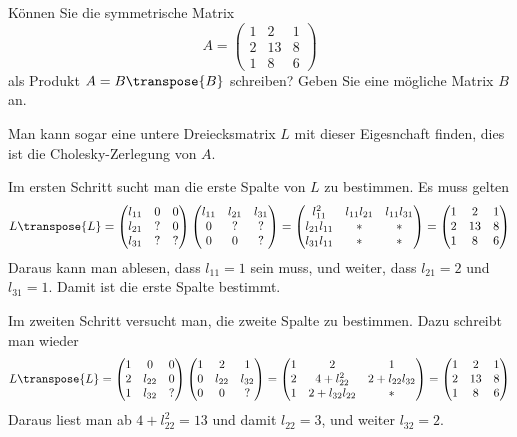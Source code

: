 Können Sie die symmetrische Matrix
\[
A=\begin{pmatrix}
1& 2&1\\
2&13&8\\
1& 8&6
\end{pmatrix}
\]
als Produkt $A=B\transpose{B}$ schreiben? Geben Sie eine mögliche Matrix $B$ an.


\begin{loesung}
Man kann sogar eine untere Dreiecksmatrix $L$ mit dieser Eigesnchaft finden,
dies ist die Cholesky-Zerlegung von $A$.

Im ersten Schritt sucht man die erste Spalte von $L$ zu bestimmen.
Es muss gelten
\[
L\transpose{L}=
\begin{pmatrix}
l_{11}&  0&  0\\
l_{21}&  ?&  0\\
l_{31}&  ?&  ?
\end{pmatrix}
\begin{pmatrix}
l_{11}&l_{21}&l_{31}\\
     0&     ?&     ?\\
     0&     0&     ?
\end{pmatrix}
=
\begin{pmatrix}
    l_{11}^2&l_{11}l_{21}&l_{11}l_{31}\\
l_{21}l_{11}&           *&           *\\
l_{31}l_{11}&           *&           *
\end{pmatrix}
=
\begin{pmatrix}
1& 2&1\\
2&13&8\\
1& 8&6
\end{pmatrix}
\]
Daraus kann man ablesen, dass $l_{11}=1$ sein muss, und weiter,
dass
$l_{21}=2$ und $l_{31}=1$. Damit ist die erste Spalte bestimmt.

Im zweiten Schritt versucht man, die zweite Spalte zu bestimmen.
Dazu schreibt man wieder
\[
L\transpose{L}
=
\begin{pmatrix}
1&     0&0\\
2&l_{22}&0\\
1&l_{32}&?
\end{pmatrix}
\begin{pmatrix}
1&     2&     1\\
0&l_{22}&l_{32}\\
0&     0&?
\end{pmatrix}
=
\begin{pmatrix}
1&2           &           1\\
2&4+l_{22}^2  &2+l_{22}l_{32}\\
1&2+l_{32}l_{22}&         *
\end{pmatrix}
=
\begin{pmatrix}
1& 2&1\\
2&13&8\\
1& 8&6
\end{pmatrix}
\]
Daraus liest man ab $4+l_{22}^2=13$ und damit $l_{22}=3$, und weiter
$l_{32}=2$.


\end{loesung}
